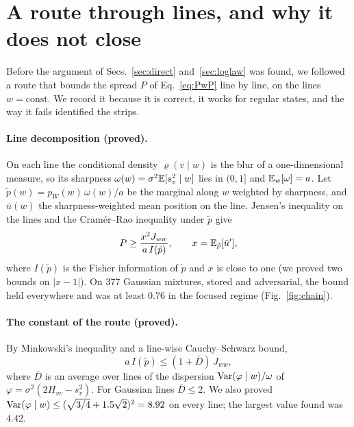 \section{A route through lines, and why it does not close}
\label{app:lines}

Before the argument of Secs.~\ref{sec:direct} and~\ref{sec:loglaw} was found, we followed a route that bounds the spread $P$ of Eq.~\eqref{eq:PwP} line by line, on the lines $w = \text{const}$. We record it because it is correct, it works for regular states, and the way it fails identified the strips.

\paragraph*{Line decomposition (proved).} On each line the conditional density $\varrho(v\mid w)$ is the blur of a one-dimensional measure, so its sharpness $\omega(w) = \sigma^2\mathbb{E}[s_v^2\mid w]$ lies in $(0,1]$ and $\mathbb{E}_w[\omega] = a$. Let $\tilde p(w) = p_W(w)\,\omega(w)/a$ be the marginal along $w$ weighted by sharpness, and $\bar u(w)$ the sharpness-weighted mean position on the line. Jensen's inequality on the lines and the Cram\'er--Rao inequality under $\tilde p$ give
\begin{equation}
P \geq \frac{x^2 J_{ww}}{a\,I(\tilde p)}, \qquad x = \mathbb{E}_{\tilde p}[\bar u'],
\end{equation}
where $I(\tilde p)$ is the Fisher information of $\tilde p$ and $x$ is close to one (we proved two bounds on $|x - 1|$). On 377 Gaussian mixtures, stored and adversarial, the bound held everywhere and was at least $0.76$ in the focused regime (Fig.~\ref{fig:chain}).

\paragraph*{The constant of the route (proved).} By Minkowski's inequality and a line-wise Cauchy--Schwarz bound,
\begin{equation}
a\,I(\tilde p) \leq (1 + \bar D)\,J_{ww},
\end{equation}
where $\bar D$ is an average over lines of the dispersion $\operatorname{Var}(\varphi\mid w)/\omega$ of $\varphi = \sigma^2(2H_{vv} - s_v^2)$. For Gaussian lines $\bar D \leq 2$. We also proved $\operatorname{Var}(\varphi\mid w) \leq (\sqrt{3/4} + 1.5\sqrt2)^2 = 8.92$ on every line; the largest value found was $4.42$.

